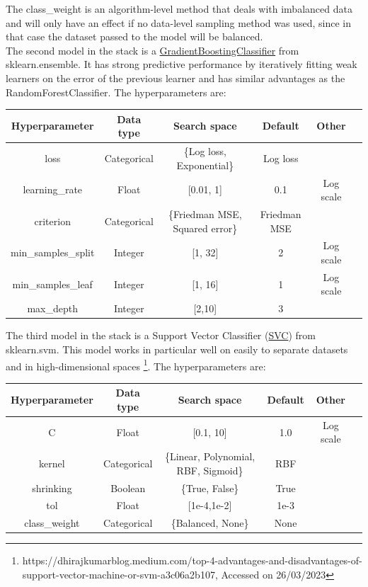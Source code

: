 \documentclass[11pt]{article}
\begin{document}
The class\_weight is an algorithm-level method that deals with imbalanced data and will only have an effect if no data-level sampling method was used, since in that case the dataset passed to the model will be balanced. \\

The second model in the stack is a \href{https://scikit-learn.org/stable/modules/generated/sklearn.ensemble.GradientBoostingClassifier.html}{GradientBoostingClassifier} from sklearn.ensemble. It has strong predictive performance by iteratively fitting weak learners on the error of the previous learner and has similar advantages as the RandomForestClassifier. The hyperparameters are:

\vspace{-0.3cm}
\begin{table}[H]
\begin{tabular}{ | c | c | c | c | c | c | }
 \hline
  Hyperparameter & Data type & Search space & Default & Other \\
 \hline
 loss & Categorical & \{Log loss, Exponential\} & Log loss &  \\ 
 learning\_rate & Float & [0.01, 1] & 0.1 & Log scale  \\ 
 criterion & Categorical & \{Friedman MSE, Squared error\} & Friedman MSE &   \\ 
 min\_samples\_split & Integer & [1, 32] & 2 & Log scale \\ 
 min\_samples\_leaf & Integer & [1, 16] & 1 & Log scale  \\
 max\_depth  & Integer & [2,10] & 3 &  \\ 
 \hline
\end{tabular}
\end{table}
\vspace{-0.3cm}

The third model in the stack is a Support Vector Classifier (\href{https://scikit-learn.org/stable/modules/generated/sklearn.svm.SVC.html#sklearn.svm.SVC}{SVC}) from sklearn.svm. This model works in particular well on easily to separate datasets and in high-dimensional spaces \footnote{https://dhirajkumarblog.medium.com/top-4-advantages-and-disadvantages-of-support-vector-machine-or-svm-a3c06a2b107, Accessed on 26/03/2023}. The hyperparameters are:

\vspace{-0.3cm}
\begin{table}[H]
\begin{tabular}{ | c | c | c | c | c | c | }
 \hline
  Hyperparameter & Data type & Search space & Default & Other \\
 \hline
 C & Float & [0.1, 10]  & 1.0 & Log scale \\ 
 kernel & Categorical & \{Linear, Polynomial, RBF, Sigmoid\}  & RBF &   \\ 
 shrinking & Boolean & \{True, False\} & True &  \\ 
 tol & Float & [1e-4,1e-2] & 1e-3 &  \\ 
 class\_weight & Categorical & \{Balanced, None\}  & None &  \\ 
 \hline
\end{tabular}
\end{table}
\end{document}
